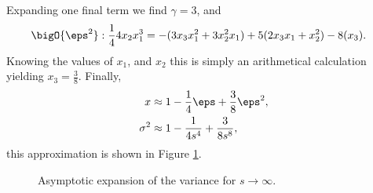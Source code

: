 Expanding one final term we find $\gamma = 3$, and
\begin{align*}
\bigO{\eps^2}: \frac{1}{4} 4x_2 x_1^3 &= -(3x_3 x_1^2 + 3x_2^2 x_1) + 5(2x_3 x_1 + x_2^2) - 8(x_3).
\end{align*}
Knowing the values of $x_1$, and $x_2$ this is simply an arithmetical calculation yielding $x_3 = \frac{3}{8}$. Finally,
\begin{align*}
x &\approx 1 - \frac{1}{4}\eps + \frac{3}{8}\eps^2, \\
\sigma^2 &\approx 1 - \frac{1}{4s^4} + \frac{3}{8s^8},
\end{align*}
this approximation is shown in Figure \ref{fig:limsinfty}.
\begin{figure}[tbp]

\caption{Asymptotic expansion of the variance for $s \rightarrow \infty$.}
\label{fig:limsinfty}
\end{figure}









